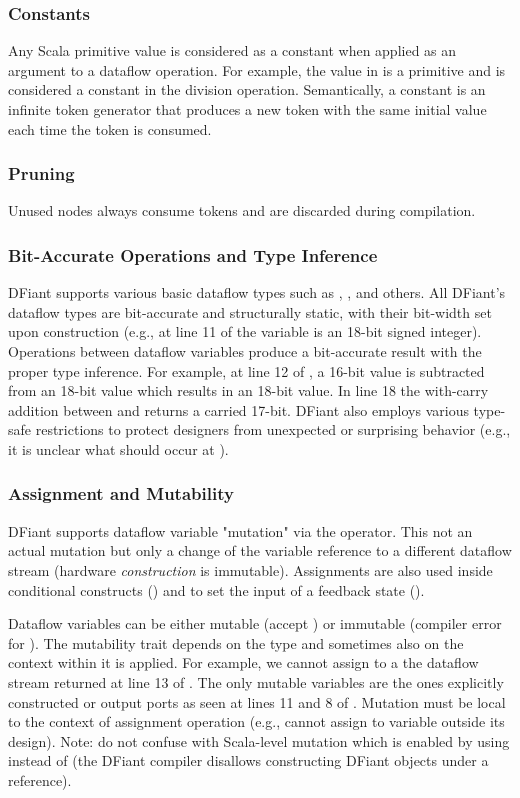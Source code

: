 \subsubsection{Constants} 
Any Scala primitive value is considered as a constant when applied as an argument to a dataflow operation. For example, the value  in  is a primitive  and is considered a constant in the division operation. Semantically, a constant is an infinite token generator that produces a new token with the same initial value each time the token is consumed.

\subsubsection{Pruning}
Unused nodes always consume tokens and are discarded during compilation. 

\subsubsection{Bit-Accurate Operations and Type Inference}
DFiant supports various basic dataflow types such as , , and others.
All DFiant's dataflow types are bit-accurate and structurally static, with their bit-width set upon construction (e.g., at line 11 of  the variable  is an 18-bit signed integer). Operations between dataflow variables produce a bit-accurate result with the proper type inference. For example, at line 12 of , a 16-bit value is subtracted from an 18-bit value which results in an 18-bit value. In line 18 the with-carry addition between  and  returns a carried 17-bit. DFiant also employs various type-safe restrictions to protect designers from unexpected or surprising behavior (e.g., it is unclear what should occur at ).

\subsubsection{Assignment and Mutability}
\label{sec:mutability}
DFiant supports dataflow variable "mutation" via the \code{:=} operator. This not an actual mutation but only a change of the variable reference to a different dataflow stream (hardware \emph{construction} is immutable). Assignments are also used inside conditional constructs () and to set the input of a feedback state ().

Dataflow variables can be either mutable (accept \code{:=}) or immutable (compiler error for \code{:=}). The mutability trait depends on the type and sometimes also on the context within it is applied. For example, we cannot assign to a the dataflow stream returned at line 13 of . The only mutable variables are the ones explicitly constructed or output ports as seen at lines 11 and 8 of . Mutation must be local to the context of assignment operation (e.g., cannot assign to variable outside its design).
Note: do not confuse with Scala-level mutation which is enabled by using  instead of  (the DFiant compiler disallows constructing DFiant objects under a  reference). 

